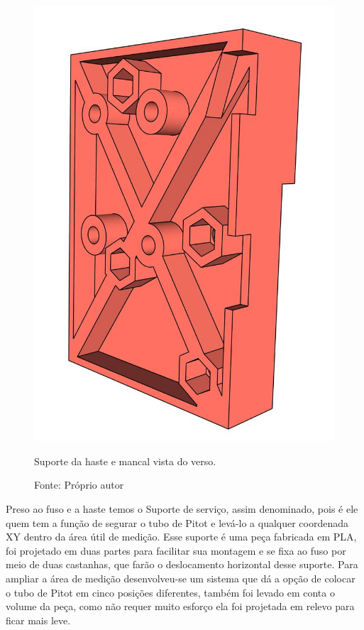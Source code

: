 \begin{figure}[H]
\centering
\includegraphics[scale = 0.4]{figuras/ressuportehastemancalfv}
\caption{Suporte da haste e mancal vista do verso.}
\caption*{Fonte: Próprio autor}
\label{fig:ressuportehastemancalfv}
\end{figure}

\pagebreak

Preso ao fuso e a haste temos o Suporte de serviço, assim denominado, pois é ele quem 
tem a função de segurar o tubo de Pitot e levá-lo a qualquer coordenada XY dentro 
da área útil de medição. Esse suporte é uma peça fabricada em \ac{PLA}, foi projetado 
em duas partes para facilitar sua montagem e se fixa ao fuso por meio de duas castanhas, 
que farão o deslocamento horizontal desse suporte. Para ampliar a área de medição 
desenvolveu-se um sistema que dá a opção de colocar o tubo de Pitot em cinco posições diferentes, 
também foi levado em conta o volume da peça, como não requer muito esforço ela foi projetada 
em relevo para ficar mais leve.

